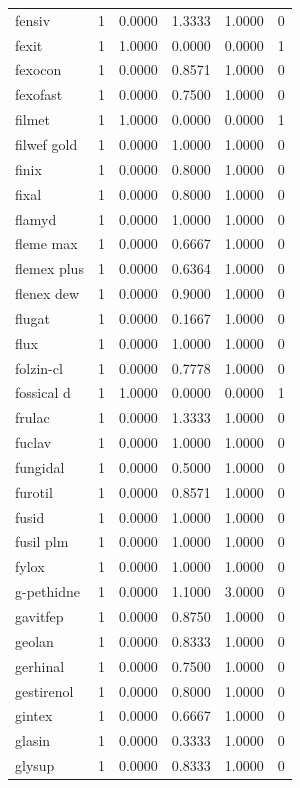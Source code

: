 \begin{longtable}{p{3.0cm}rrrrr}
fensiv & 1 & 0.0000 & 1.3333 & 1.0000 & 0 \\
fexit & 1 & 1.0000 & 0.0000 & 0.0000 & 1 \\
fexocon & 1 & 0.0000 & 0.8571 & 1.0000 & 0 \\
fexofast & 1 & 0.0000 & 0.7500 & 1.0000 & 0 \\
filmet & 1 & 1.0000 & 0.0000 & 0.0000 & 1 \\
filwef gold & 1 & 0.0000 & 1.0000 & 1.0000 & 0 \\
finix & 1 & 0.0000 & 0.8000 & 1.0000 & 0 \\
fixal & 1 & 0.0000 & 0.8000 & 1.0000 & 0 \\
flamyd & 1 & 0.0000 & 1.0000 & 1.0000 & 0 \\
fleme max & 1 & 0.0000 & 0.6667 & 1.0000 & 0 \\
flemex plus & 1 & 0.0000 & 0.6364 & 1.0000 & 0 \\
flenex dew & 1 & 0.0000 & 0.9000 & 1.0000 & 0 \\
flugat & 1 & 0.0000 & 0.1667 & 1.0000 & 0 \\
flux & 1 & 0.0000 & 1.0000 & 1.0000 & 0 \\
folzin-cl & 1 & 0.0000 & 0.7778 & 1.0000 & 0 \\
fossical d & 1 & 1.0000 & 0.0000 & 0.0000 & 1 \\
frulac & 1 & 0.0000 & 1.3333 & 1.0000 & 0 \\
fuclav & 1 & 0.0000 & 1.0000 & 1.0000 & 0 \\
fungidal & 1 & 0.0000 & 0.5000 & 1.0000 & 0 \\
furotil & 1 & 0.0000 & 0.8571 & 1.0000 & 0 \\
fusid & 1 & 0.0000 & 1.0000 & 1.0000 & 0 \\
fusil plm & 1 & 0.0000 & 1.0000 & 1.0000 & 0 \\
fylox & 1 & 0.0000 & 1.0000 & 1.0000 & 0 \\
g-pethidne & 1 & 0.0000 & 1.1000 & 3.0000 & 0 \\
gavitfep & 1 & 0.0000 & 0.8750 & 1.0000 & 0 \\
geolan & 1 & 0.0000 & 0.8333 & 1.0000 & 0 \\
gerhinal & 1 & 0.0000 & 0.7500 & 1.0000 & 0 \\
gestirenol & 1 & 0.0000 & 0.8000 & 1.0000 & 0 \\
gintex & 1 & 0.0000 & 0.6667 & 1.0000 & 0 \\
glasin & 1 & 0.0000 & 0.3333 & 1.0000 & 0 \\
glysup & 1 & 0.0000 & 0.8333 & 1.0000 & 0 \\

\end{longtable}
